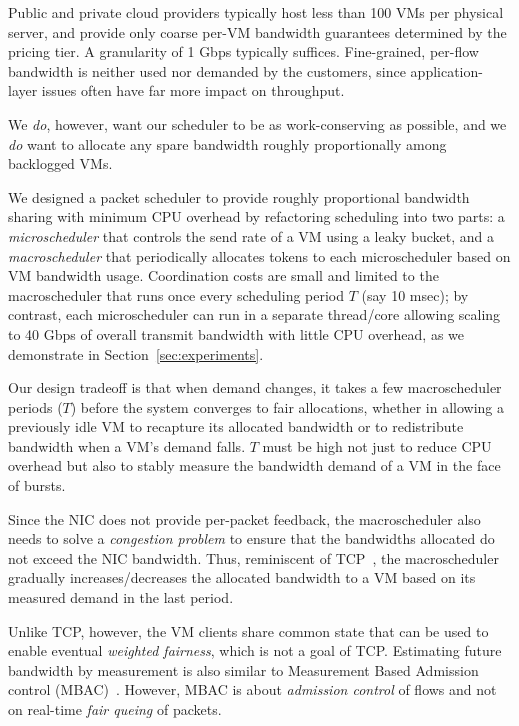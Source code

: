  Public and private cloud providers typically host 
less than 100 VMs per physical server, and provide only coarse per-VM bandwidth guarantees
determined by the pricing tier.  A granularity of 1 Gbps typically suffices.  Fine-grained, per-flow bandwidth is neither
used nor demanded by the customers, since application-layer issues often have
far more impact on throughput.

We {\em do}, however, want our scheduler to be as
work-conserving as possible, and we {\em do} want to allocate any spare
bandwidth roughly proportionally among backlogged VMs.

We designed a packet scheduler to provide roughly proportional bandwidth sharing
with  minimum CPU overhead by refactoring scheduling into two parts: a {\em
microscheduler} that controls the send rate of a VM using a leaky bucket,
and a {\em macroscheduler} that periodically allocates tokens to each
microscheduler based on VM bandwidth usage.  Coordination costs are small and
limited to the macroscheduler that runs once every scheduling period $T$ (say 10
msec); by contrast, each microscheduler can run in a separate thread/core
allowing scaling to 40 Gbps of overall transmit bandwidth with little CPU
overhead, as we demonstrate in Section~\ref{sec:experiments}.

Our design tradeoff is that when demand changes, it takes a few 
macroscheduler periods ($T$) before the system converges to fair allocations,
whether in allowing a previously idle VM to recapture its allocated bandwidth or
to redistribute bandwidth when a VM's demand falls.  $T$  must be high not just
to reduce CPU overhead but also to stably measure the bandwidth demand of a VM
in the face of bursts.

Since the NIC does not provide per-packet feedback, the macroscheduler also
needs to solve a {\em congestion problem} to ensure that the bandwidths
allocated do not exceed the NIC bandwidth.  Thus, reminiscent of TCP~\cite{tcp},
the macroscheduler gradually increases/decreases the allocated bandwidth to a VM
based on its measured demand in the last period.  

Unlike TCP, however, the VM clients share common state that can be used to
enable eventual {\em weighted fairness}, which is not a goal of TCP.  Estimating
future bandwidth by measurement is also similar to  Measurement Based Admission
control (MBAC)~\cite{mbac}.  However, MBAC is about {\em admission control} of
flows  and not on real-time {\em fair queing} of packets. 

